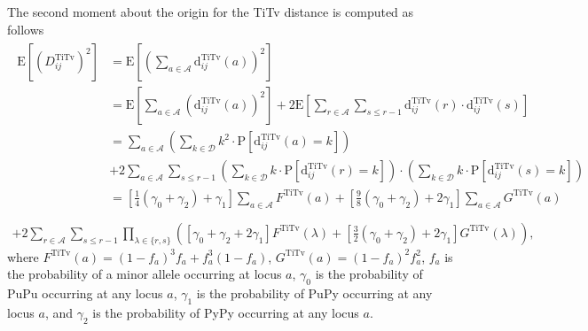 \documentclass[10pt,letterpaper]{article}
\begin{document}
The second moment about the origin for the TiTv distance is computed as follows
%
\begin{equation}\label{eq:mu2_DDistr_TiTv}
\begin{split}
\begin{aligned}
\text{E}\left[\left(D^\text{TiTv}_{ij}\right)^2\right] &= \text{E}\left[\left(\sum_{a \in \mathcal{A}} \text{d}^\text{TiTv}_{ij}(a)\right)^2\right] \\
&= \text{E}\left[\sum_{a \in \mathcal{A}} \left(\text{d}^\text{TiTv}_{ij}(a)\right)^2\right] + 2 \text{E}\left[\sum_{r \in \mathcal{A}} \sum_{s \leq r - 1} \text{d}^\text{TiTv}_{ij}(r) \cdot \text{d}^\text{TiTv}_{ij}(s)\right] \\
&= \sum_{a \in \mathcal{A}} \left(\sum_{k \in \mathcal{D}} k^2 \cdot \text{P}\left[\text{d}^\text{TiTv}_{ij}(a) = k\right]\right) \\
&+ 2\sum_{a \in \mathcal{A}} \sum_{s \leq r - 1} \left(\sum_{k \in \mathcal{D}} k \cdot \text{P}\left[\text{d}^\text{TiTv}_{ij}(r) = k\right]\right) \cdot \left(\sum_{k \in \mathcal{D}} k \cdot \text{P}\left[\text{d}^\text{TiTv}_{ij}(s) = k\right]\right) \\
&= \left[\frac{1}{4}(\gamma_0 + \gamma_2) + \gamma_1\right] \sum_{a \in \mathcal{A}} F^\text{TiTv}(a) + \left[\frac{9}{8}(\gamma_0 + \gamma_2) + 2\gamma_1\right] \sum_{a \in \mathcal{A}} G^\text{TiTv}(a) \\
\end{aligned} \\
+ 2 \sum_{r \in \mathcal{A}} \sum_{s \leq r - 1} \prod_{\lambda \in \{r,s\}} \left([\gamma_0 + \gamma_2 + 2\gamma_1] F^\text{TiTv}(\lambda) + \left[\frac{3}{2}(\gamma_0 + \gamma_2) + 2\gamma_1\right] G^\text{TiTv}(\lambda)\right),
\end{split}
\end{equation}
%
where $F^\text{TiTv}(a) = (1 - f_a)^3 f_a + f^3_a (1 - f_a)$, $G^\text{TiTv}(a) = (1 - f_a)^2 f^2_a$, $f_a$ is the probability of a minor allele occurring at locus $a$, $\gamma_0$ is the probability of PuPu occurring at any locus $a$, $\gamma_1$ is the probability of PuPy occurring at any locus $a$, and $\gamma_2$ is the probability of PyPy occurring at any locus $a$.
\end{document}
